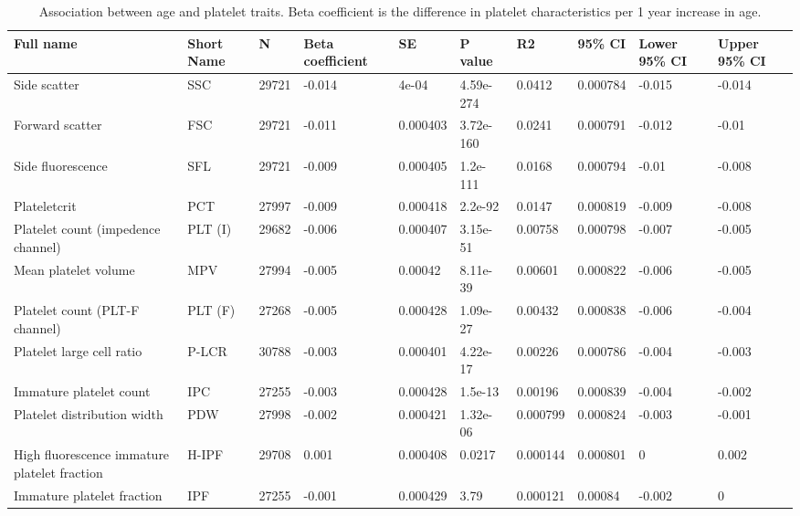 \documentclass[11pt,twoside]{bristolthesis}
\begin{document}
\begin{landscape}\begin{table}

\caption[Association between age and platelet traits]{\label{tab:age-platelets}Association between age and platelet traits. Βeta coefficient is the difference in platelet characteristics per 1 year increase in age.}
\centering
\begin{tabu} to 
\toprule
Full name & Short Name & N & Βeta coefficient & SE & P value & R2 & 95\% CI & Lower 95\% CI & Upper 95\% CI\\
\midrule
Side scatter & SSC & 29721 & -0.014 & 4e-04 & 4.59e-274 & 0.0412 & 0.000784 & -0.015 & -0.014\\
Forward scatter & FSC & 29721 & -0.011 & 0.000403 & 3.72e-160 & 0.0241 & 0.000791 & -0.012 & -0.01\\
Side fluorescence & SFL & 29721 & -0.009 & 0.000405 & 1.2e-111 & 0.0168 & 0.000794 & -0.01 & -0.008\\
Plateletcrit & PCT & 27997 & -0.009 & 0.000418 & 2.2e-92 & 0.0147 & 0.000819 & -0.009 & -0.008\\
Platelet count (impedence channel) & PLT (I) & 29682 & -0.006 & 0.000407 & 3.15e-51 & 0.00758 & 0.000798 & -0.007 & -0.005\\
\addlinespace
Mean platelet volume & MPV & 27994 & -0.005 & 0.00042 & 8.11e-39 & 0.00601 & 0.000822 & -0.006 & -0.005\\
Platelet count (PLT-F channel) & PLT (F) & 27268 & -0.005 & 0.000428 & 1.09e-27 & 0.00432 & 0.000838 & -0.006 & -0.004\\
Platelet large cell ratio & P-LCR & 30788 & -0.003 & 0.000401 & 4.22e-17 & 0.00226 & 0.000786 & -0.004 & -0.003\\
Immature platelet count & IPC & 27255 & -0.003 & 0.000428 & 1.5e-13 & 0.00196 & 0.000839 & -0.004 & -0.002\\
Platelet distribution width & PDW & 27998 & -0.002 & 0.000421 & 1.32e-06 & 0.000799 & 0.000824 & -0.003 & -0.001\\
\addlinespace
High fluorescence immature platelet fraction & H-IPF & 29708 & 0.001 & 0.000408 & 0.0217 & 0.000144 & 0.000801 & 0 & 0.002\\
Immature platelet fraction & IPF & 27255 & -0.001 & 0.000429 & 3.79 & 0.000121 & 0.00084 & -0.002 & 0\\
\bottomrule
\end{tabu}
\end{table}
\end{landscape}
\end{document}
